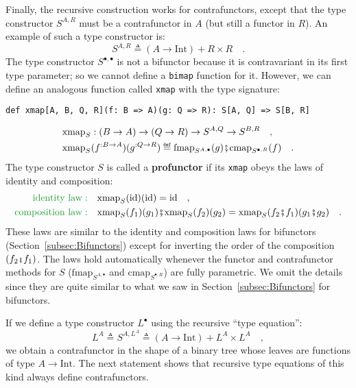 Finally, the recursive construction works for contrafunctors, except
that the type constructor $S^{A,R}$ must be a contrafunctor in $A$
(but still a functor in $R$). An example of such a type constructor
is:
\begin{equation}
S^{A,R}\triangleq\left(A\rightarrow\text{Int}\right)+R\times R\quad.\label{eq:f-example-contra-bifunctor}
\end{equation}
The type constructor $S^{\bullet,\bullet}$ is not a bifunctor because
it is contravariant in its first type parameter; so we cannot define
a \lstinline!bimap! function for it. However, we can define an analogous
function called \lstinline!xmap! with the type signature:
\begin{lstlisting}
def xmap[A, B, Q, R](f: B => A)(g: Q => R): S[A, Q] => S[B, R]
\end{lstlisting}
\begin{align*}
 & \text{xmap}_{S}:\left(B\rightarrow A\right)\rightarrow\left(Q\rightarrow R\right)\rightarrow S^{A,Q}\rightarrow S^{B,R}\quad,\\
 & \text{xmap}_{S}(f^{:B\rightarrow A})(g^{:Q\rightarrow R})\triangleq\text{fmap}_{S^{A,\bullet}}(g)\bef\text{cmap}_{S^{\bullet,R}}(f)\quad.
\end{align*}
The type constructor $S$ is called a \textbf{profunctor}
if its \lstinline!xmap! obeys the laws of identity and composition:
\begin{align}
{\color{greenunder}\text{identity law}:}\quad & \text{xmap}_{S}(\text{id})(\text{id})=\text{id}\quad,\label{eq:f-profunctor-identity-law}\\
{\color{greenunder}\text{composition law}:}\quad & \text{xmap}_{S}(f_{1})(g_{1})\bef\text{xmap}_{S}(f_{2})(g_{2})=\text{xmap}_{S}(f_{2}\bef f_{1})(g_{1}\bef g_{2})\quad.\label{eq:f-profunctor-composition-law}
\end{align}
These laws are similar to the identity and composition laws for bifunctors
(Section~\ref{subsec:Bifunctors}) except for inverting the order
of the composition $\left(f_{2}\bef f_{1}\right)$. The laws hold
automatically whenever the functor and contrafunctor methods for $S$
($\text{fmap}_{S^{A,\bullet}}$ and $\text{cmap}_{S^{\bullet,R}}$)
are fully parametric. We omit the details since they are quite similar
to what we saw in Section~\ref{subsec:Bifunctors} for bifunctors.

If we define a type constructor $L^{\bullet}$ using the recursive
\textsf{``}type equation\textsf{''}:
\[
L^{A}\triangleq S^{A,L^{A}}\triangleq\left(A\rightarrow\text{Int}\right)+L^{A}\times L^{A}\quad,
\]
we obtain a contrafunctor in the shape of a binary tree whose leaves
are functions of type $A\rightarrow\text{Int}$. The next statement
shows that recursive type equations of this kind always define contrafunctors.

